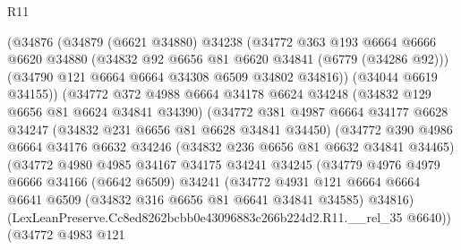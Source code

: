 \begin{lexlean}{R11}
\begin{coremodule}
                    (@34876
                      (@34879
                        (@6621 @34880)
                        @34238
                        (@34772
                          @363
                          @193
                          @6664
                          @6666
                          @6620
                          @34880
                          (@34832 @92 @6656 @81 @6620 @34841 (@6779 (@34286 @92)))
                          (@34790 @121 @6664 @6664 @34308 @6509 @34802 @34816))
                        (@34044 @6619 @34155))
                      (@34772
                        @372
                        @4988
                        @6664
                        @34178
                        @6624
                        @34248
                        (@34832 @129 @6656 @81 @6624 @34841 @34390)
                        (@34772
                          @381
                          @4987
                          @6664
                          @34177
                          @6628
                          @34247
                          (@34832 @231 @6656 @81 @6628 @34841 @34450)
                          (@34772
                            @390
                            @4986
                            @6664
                            @34176
                            @6632
                            @34246
                            (@34832 @236 @6656 @81 @6632 @34841 @34465)
                            (@34772
                              @4980
                              @4985
                              @34167
                              @34175
                              @34241
                              @34245
                              (@34779
                                @4976
                                @4979
                                @6666
                                @34166
                                (@6642 @6509)
                                @34241
                                (@34772
                                  @4931
                                  @121
                                  @6664
                                  @6664
                                  @6641
                                  @6509
                                  (@34832 @316 @6656 @81 @6641 @34841 @34585)
                                  @34816)
                                (LexLeanPreserve.Cc8ed8262bcbb0e43096883c266b224d2.R11.__rel_35
                                  @6640))
                              (@34772
                                @4983
                                @121

\end{coremodule}
\end{lexlean}
